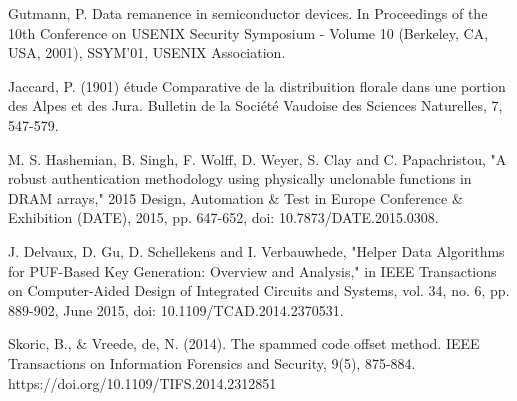 \documentclass[journal, a4paper]{IEEEtran}
\begin{document}
\begin{thebibliography}{1}
    Gutmann, P. Data remanence in semiconductor devices. In Proceedings of the 10th Conference on USENIX Security Symposium - Volume 10 (Berkeley, CA, USA, 2001), SSYM’01, USENIX Association.

    Jaccard, P. (1901) étude Comparative de la distribuition florale dans une portion des Alpes et des Jura. Bulletin de la Société Vaudoise des Sciences Naturelles, 7, 547-579.

    M. S. Hashemian, B. Singh, F. Wolff, D. Weyer, S. Clay and C. Papachristou, "A robust authentication methodology using physically unclonable functions in DRAM arrays," 2015 Design, Automation \& Test in Europe Conference \& Exhibition (DATE), 2015, pp. 647-652, doi: 10.7873/DATE.2015.0308.

    J. Delvaux, D. Gu, D. Schellekens and I. Verbauwhede, "Helper Data Algorithms for PUF-Based Key Generation: Overview and Analysis," in IEEE Transactions on Computer-Aided Design of Integrated Circuits and Systems, vol. 34, no. 6, pp. 889-902, June 2015, doi: 10.1109/TCAD.2014.2370531.

    Skoric, B., \& Vreede, de, N. (2014). The spammed code offset method. IEEE Transactions on Information Forensics and Security, 9(5), 875-884. https://doi.org/10.1109/TIFS.2014.2312851

\end{thebibliography}

\end{document}
